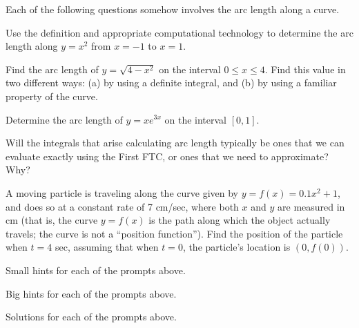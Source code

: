 \begin{activity} \label{A:6.1.3}  Each of the following questions somehow involves the arc length along a curve.
\ba
	
	\item Use the definition and appropriate computational technology to determine the arc length along $y = x^2$ from $x = -1$ to $x = 1$.
	\item Find the arc length of $y = \sqrt{4-x^2}$ on the interval $0 \le x \le 4$.  Find this value in two different ways: (a) by using a definite integral, and (b) by using a familiar property of the curve.
	\item Determine the arc length of $y = xe^{3x}$ on the interval $[0,1]$.
	\item Will the integrals that arise calculating arc length typically be ones that we can evaluate exactly using the First FTC, or ones that we need to approximate?  Why?
	\item A moving particle is traveling along the curve given by $y = f(x) = 0.1x^2 + 1$, and does so at a constant rate of 7 cm/sec, where both $x$ and $y$ are measured in cm (that is, the curve $y = f(x)$ is the path along which the object actually travels; the curve is not a ``position function'').  Find the position of the particle when $t = 4$ sec, assuming that when $t = 0$, the particle's location is $(0,f(0))$.
\ea

\end{activity}
\begin{smallhint}
\ba
	\item Small hints for each of the prompts above.
\ea
\end{smallhint}
\begin{bighint}
\ba
	\item Big hints for each of the prompts above.
\ea
\end{bighint}
\begin{activitySolution}
\ba
	\item Solutions for each of the prompts above.
\ea
\end{activitySolution}
\aftera